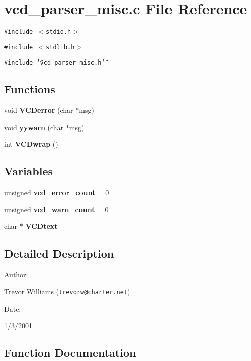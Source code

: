 \section{vcd\_\-parser\_\-misc.c File Reference}
\label{vcd__parser__misc_8c}
{\tt \#include $<$stdio.h$>$}\par
{\tt \#include $<$stdlib.h$>$}\par
{\tt \#include \char`\"{}vcd\_\-parser\_\-misc.h\char`\"{}}\par
\subsection*{Functions}
\begin{CompactItemize}
\item 
void {\bf VCDerror} (char $\ast$msg)
\item 
void {\bf yywarn} (char $\ast$msg)
\item 
int {\bf VCDwrap} ()
\end{CompactItemize}
\subsection*{Variables}
\begin{CompactItemize}
\item 
unsigned {\bf vcd\_\-error\_\-count} = 0
\item 
unsigned {\bf vcd\_\-warn\_\-count} = 0
\item 
char $\ast$ {\bf VCDtext}
\end{CompactItemize}


\subsection{Detailed Description}


\begin{Desc}
\item[Author: ]\par
Trevor Williams ({\tt trevorw@charter.net}) \end{Desc}
\begin{Desc}
\item[Date: ]\par
1/3/2001\end{Desc}


\subsection{Function Documentation}
